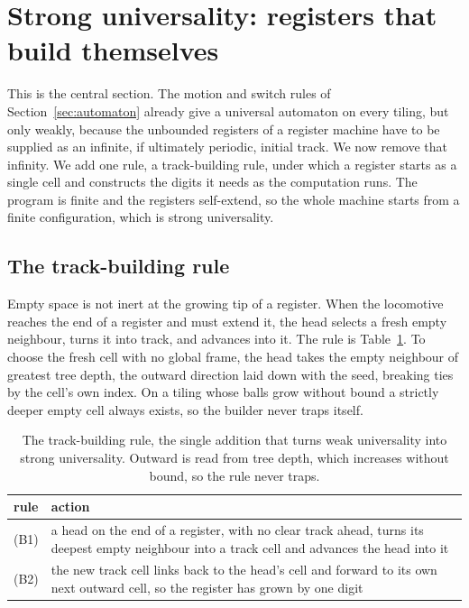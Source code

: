 \section{Strong universality: registers that build themselves}
\label{sec:strong}

This is the central section. The motion and switch rules of Section~\ref{sec:automaton} already give a universal
automaton on every tiling, but only weakly, because the unbounded registers of a register machine have to be
supplied as an infinite, if ultimately periodic, initial track. We now remove that infinity. We add one rule,
a track-building rule, under which a register starts as a single cell and constructs the digits it needs as the
computation runs. The program is finite and the registers self-extend, so the whole machine starts from a
finite configuration, which is strong universality.

\subsection{The track-building rule}

Empty space is not inert at the growing tip of a register. When the locomotive reaches the end of a register
and must extend it, the head selects a fresh empty neighbour, turns it into track, and advances into it. The
rule is Table~\ref{tab:build}. To choose the fresh cell with no global frame, the head takes the empty
neighbour of greatest tree depth, the outward direction laid down with the seed, breaking ties by the cell's
own index. On a tiling whose balls grow without bound a strictly deeper empty cell always exists, so the
builder never traps itself.

\begin{table}[ht]
\centering
\begin{tabular}{@{}lp{10.0cm}@{}}
\toprule
rule & action \\
\midrule
(B1) & a head on the end of a register, with no clear track ahead, turns its deepest empty neighbour into a
track cell and advances the head into it \\
(B2) & the new track cell links back to the head's cell and forward to its own next outward cell, so the
register has grown by one digit \\
\bottomrule
\end{tabular}
\caption{The track-building rule, the single addition that turns weak universality into strong universality.
Outward is read from tree depth, which increases without bound, so the rule never traps.}
\label{tab:build}
\end{table}

